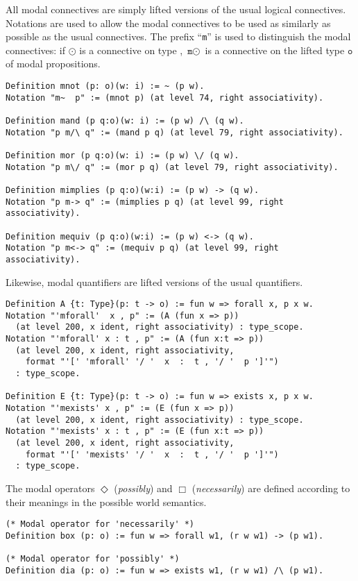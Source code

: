 \documentclass{llncs}
\begin{document}
\noindent
All modal connectives are simply lifted versions of the usual logical connectives. Notations are used to allow the modal connectives to be used as similarly as possible as the usual connectives. The prefix ``\texttt{m}'' is used to distinguish the modal connectives: if $\odot$ is a connective on type , $\texttt{m}\odot$ is a connective on the lifted type $\texttt{o}$ of modal propositions.  

\begin{verbatim}
Definition mnot (p: o)(w: i) := ~ (p w).
Notation "m~  p" := (mnot p) (at level 74, right associativity).

Definition mand (p q:o)(w: i) := (p w) /\ (q w).
Notation "p m/\ q" := (mand p q) (at level 79, right associativity).

Definition mor (p q:o)(w: i) := (p w) \/ (q w).
Notation "p m\/ q" := (mor p q) (at level 79, right associativity).

Definition mimplies (p q:o)(w:i) := (p w) -> (q w).
Notation "p m-> q" := (mimplies p q) (at level 99, right associativity).

Definition mequiv (p q:o)(w:i) := (p w) <-> (q w).
Notation "p m<-> q" := (mequiv p q) (at level 99, right associativity).
\end{verbatim}

\noindent
Likewise, modal quantifiers are lifted versions of the usual quantifiers.

\begin{verbatim}
Definition A {t: Type}(p: t -> o) := fun w => forall x, p x w.
Notation "'mforall'  x , p" := (A (fun x => p))
  (at level 200, x ident, right associativity) : type_scope.
Notation "'mforall' x : t , p" := (A (fun x:t => p))
  (at level 200, x ident, right associativity, 
    format "'[' 'mforall' '/ '  x  :  t , '/ '  p ']'")
  : type_scope.

Definition E {t: Type}(p: t -> o) := fun w => exists x, p x w.
Notation "'mexists' x , p" := (E (fun x => p))
  (at level 200, x ident, right associativity) : type_scope.
Notation "'mexists' x : t , p" := (E (fun x:t => p))
  (at level 200, x ident, right associativity, 
    format "'[' 'mexists' '/ '  x  :  t , '/ '  p ']'")
  : type_scope.
\end{verbatim}

\noindent
The modal operators $\Diamond$ (\emph{possibly}) and $\Box$ (\emph{necessarily}) are defined according to their meanings in the possible world semantics.

\begin{verbatim}
(* Modal operator for 'necessarily' *)
Definition box (p: o) := fun w => forall w1, (r w w1) -> (p w1).

(* Modal operator for 'possibly' *)
Definition dia (p: o) := fun w => exists w1, (r w w1) /\ (p w1).
\end{verbatim}
\end{document}
